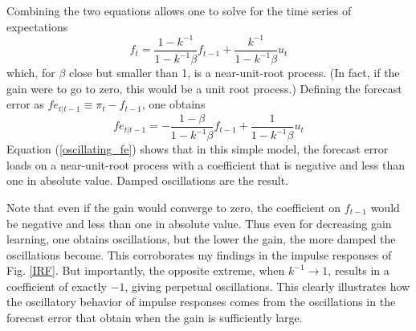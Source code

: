 \documentclass[11pt]{article}
\renewcommand{\[}{\begin{equation}}
\renewcommand{\]}{\end{equation}}
\begin{document}
Combining the two equations allows one to solve for the time series of expectations
\begin{equation}
f_t = \frac{1-k^{-1}}{1-k^{-1}\beta}f_{t-1} + \frac{k^{-1}}{1-k^{-1}\beta}u_t
\end{equation}
which, for $\beta$ close but smaller than 1, is a near-unit-root process. (In fact, if the gain were to go to zero, this would be a unit root process.) Defining the forecast error as $fe_{t|t-1} \equiv \pi_t - f_{t-1}$, one obtains
\begin{equation}
fe_{t|t-1} = -\frac{1-\beta}{1-k^{-1}\beta}f_{t-1} + \frac{1}{1-k^{-1}\beta}u_t \label{oscillating_fe}
\end{equation}
Equation (\ref{oscillating_fe}) shows that in this simple model, the forecast error loads on a near-unit-root process with a coefficient that is negative and less than one in absolute value. Damped oscillations are the result. 

Note that even if the gain would converge to zero, the coefficient on $f_{t-1}$ would be negative and less than one in absolute value. Thus even for decreasing gain learning, one obtains oscillations, but the lower the gain, the more damped the oscillations become. This corroborates my findings in the impulse responses of Fig. \ref{IRF}. But importantly, the opposite extreme, when $k^{-1}\rightarrow 1$, results in a coefficient of exactly $-1$, giving perpetual oscillations. This clearly illustrates how the oscillatory behavior of impulse responses comes from the oscillations in the forecast error that obtain when the gain is sufficiently large. 
\end{document}
